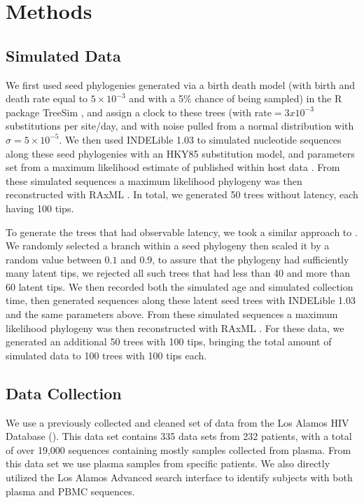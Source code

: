 \section{Methods} \label{sec:methods}
\subsection{Simulated Data} \label{subsec:simdata}
We first used seed phylogenies generated via a birth death model (with birth and death rate equal to $5\times10^{-3}$ and with a 5\% chance of being sampled) in the R package TreeSim \citep{TreeSim, Stradler13, Boskova14}, and assign a clock to these trees (with rate$=3x10^{-3}$ substitutions per site/day, and with noise pulled from a normal distribution with $\sigma=5\times10^{-5}$.
We then used INDELible 1.03 \citep{Indelible09} to simulated nucleotide sequences along these seed phylogenies with an HKY85 \citep{HKY85} substitution model, and  parameters set from a maximum likelihood estimate of published within host data \citep{McCloskey14}. 
From these simulated sequences a maximum likelihood phylogeny was then reconstructed with RAxML \citep{Raxml14}. In total, we generated 50 trees without latency, each having 100 tips. 

To generate the trees that had observable latency, we took a similar approach to \cite{Immonen14}. 
We randomly selected a branch within a seed phylogeny then scaled it by a random value between $0.1$ and $0.9$, to assure that the phylogeny had sufficiently many latent tips, we rejected all such trees that had less than 40 and more than 60 latent tips. 
We then recorded both the simulated age and simulated collection time, then generated sequences along these latent seed trees with INDELible 1.03 \citep{Indelible09} and the same parameters above. 
From these simulated sequences a maximum likelihood phylogeny was then reconstructed with RAxML \citep{Raxml14}.
For these data, we generated an additional 50 trees with 100 tips, bringing the total amount of simulated data to 100 trees with 100 tips each. 


\subsection{Data Collection} \label{subsec:dcollection}
We use a previously collected and cleaned set of data \citep{McCloskey14} from the Los Alamos HIV Database (). 
This data set contains 335 data sets from 232 patients, with a total of over 19,000 sequences \citep{McCloskey14} containing mostly samples collected from plasma. 
From this data set we use  plasma samples from  specific patients. 
We also directly utilized the Los Alamos Advanced search interface \citep{LosAlamos} to identify subjects with both plasma and PBMC sequences.

